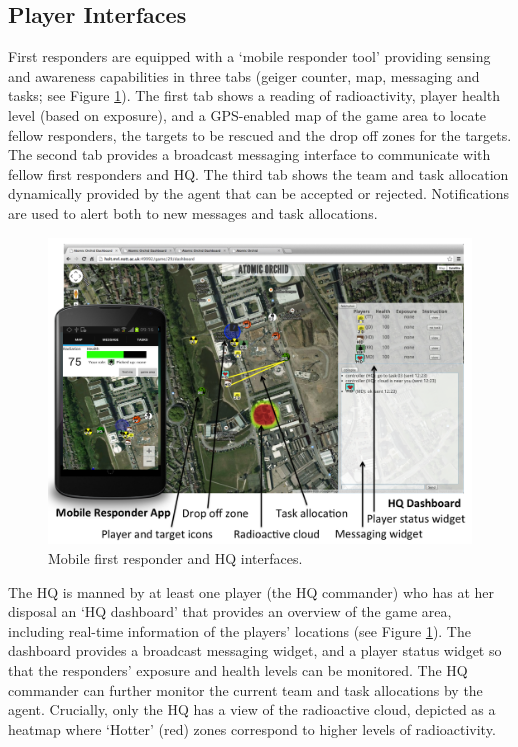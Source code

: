 \subsection{Player Interfaces}
\noindent First responders are equipped with a `mobile responder tool' providing sensing and awareness capabilities in three tabs (geiger counter, map, messaging and tasks; see Figure \ref{fig:ui}). The first tab shows a reading of radioactivity, player health level (based on exposure), and a GPS-enabled map of the game area to locate fellow responders, the targets to be rescued and the drop off zones for the targets. The second tab provides a broadcast messaging interface to communicate with fellow first responders and HQ. The third tab shows the team and task allocation dynamically provided by the agent that can be accepted or rejected. Notifications are used to alert both to new messages and task allocations.

\begin{figure}[htbp]
\includegraphics[width=\columnwidth]{UI.png}
\caption{Mobile first responder and HQ interfaces.\vspace{-3mm}
\label{fig:ui}
}\end{figure}

The HQ is manned by at least one player (the HQ commander) who has at her disposal an `HQ dashboard' that provides an overview of the game area, including real-time information of the players' locations (see Figure \ref{fig:ui}). The dashboard provides a broadcast messaging widget, and a player status widget so that the responders' exposure and health levels can be monitored. The HQ commander can further monitor the  current team and task allocations by the agent. Crucially, only the HQ has a view of the radioactive cloud, depicted as a heatmap where `Hotter'  (red) zones correspond to higher levels of radioactivity.

